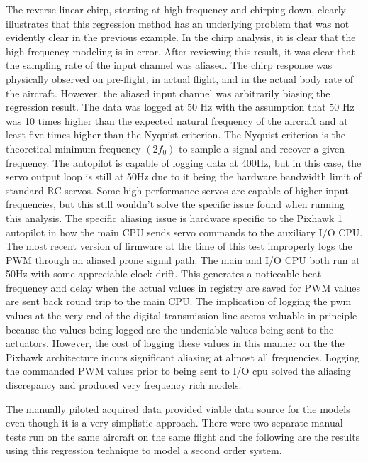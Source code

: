 The reverse linear chirp, starting at high frequency and chirping down, clearly illustrates that this regression method has an underlying problem that was not evidently clear in the previous example.  In the chirp analysis, it is clear that the high frequency modeling is in error.  After reviewing this result, it was clear that the sampling rate of the input channel was aliased.  The chirp response was physically observed on pre-flight, in actual flight, and in the actual body rate of the aircraft.  However, the aliased input channel was arbitrarily biasing the regression result.  The data was logged at 50 Hz with the assumption that 50 Hz was 10 times higher than the expected natural frequency of the aircraft and at least five times higher than the Nyquist criterion.  The Nyquist criterion is the theoretical minimum frequency $(2f_0)$ to sample a signal and recover a given frequency.  The autopilot is capable of logging data at 400Hz, but in this case, the servo output loop is still at 50Hz due to it being the hardware bandwidth limit of standard \ac{RC} servos.  Some high performance servos are capable of higher input frequencies, but this still wouldn't solve the specific issue found when running this analysis.  The specific aliasing issue is hardware specific to the Pixhawk 1 autopilot in how the main CPU sends servo commands to the auxiliary I/O  CPU.  The most recent version of firmware at the time of this test improperly logs the \ac{PWM} through an aliased prone signal path.  The main and I/O CPU both run at 50Hz with some appreciable clock drift.  This generates a noticeable beat frequency and delay when the actual values in registry are saved for \ac{PWM} values are sent back round trip to the main CPU.  The implication of logging the pwm values at the very end of the digital transmission line seems valuable in principle because the values being logged are the undeniable values being sent to the actuators.  However, the cost of logging these values in this manner on the the Pixhawk architecture incurs significant aliasing at almost all frequencies.  Logging the commanded \ac{PWM} values prior to being sent to I/O cpu solved the aliasing discrepancy and produced very frequency rich models.

The manually piloted acquired data provided viable data source for the models even though it is a very simplistic approach.  There were two separate manual tests run on the same aircraft on the same flight and the following are the results using this regression technique to model a second order system.


